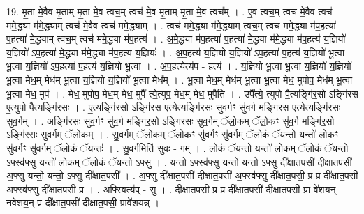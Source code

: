 \documentclass[17pt]{extarticle}
\begin{document}
19. मृ॒ता मे॒वैव मृ॒ताम् मृ॒ता मे॒व त्वच॒म् त्वच॑ मे॒व मृ॒ताम् मृ॒ता मे॒व त्वच᳚म् । . ए॒व त्वच॒म् त्वच॑ मे॒वैव त्वच॑ ममे॒द्ध्या म॑मे॒द्ध्याम् त्वच॑ मे॒वैव त्वच॑ ममे॒द्ध्याम् । . त्वच॑ ममे॒द्ध्या म॑मे॒द्ध्याम् त्वच॒म् त्वच॑ ममे॒द्ध्या म॑प॒हत्या॑ प॒हत्या॑ मे॒द्ध्याम् त्वच॒म् त्वच॑ ममे॒द्ध्या म॑प॒हत्य॑ । . अ॒मे॒द्ध्या म॑प॒हत्या॑ प॒हत्या॑ मे॒द्ध्या म॑मे॒द्ध्या म॑प॒हत्य॑ य॒ज्ञियो॑ य॒ज्ञियो॑ ऽप॒हत्या॑ मे॒द्ध्या म॑मे॒द्ध्या म॑प॒हत्य॑ य॒ज्ञियः॑ । . अ॒प॒हत्य॑ य॒ज्ञियो॑ य॒ज्ञियो॑ ऽप॒हत्या॑ प॒हत्य॑ य॒ज्ञियो॑ भू॒त्वा भू॒त्वा य॒ज्ञियो॑ ऽप॒हत्या॑ प॒हत्य॑ य॒ज्ञियो॑ भू॒त्वा । . अ॒प॒हत्येत्य॑प - हत्य॑ । . य॒ज्ञियो॑ भू॒त्वा भू॒त्वा य॒ज्ञियो॑ य॒ज्ञियो॑ भू॒त्वा मेध॒म् मेध॑म् भू॒त्वा य॒ज्ञियो॑ य॒ज्ञियो॑ भू॒त्वा मेध᳚म् । . भू॒त्वा मेध॒म् मेध॑म् भू॒त्वा भू॒त्वा मेध॒ मुपोप॒ मेध॑म् भू॒त्वा भू॒त्वा मेध॒ मुप॑ । . मेध॒ मुपोप॒ मेध॒म् मेध॒ मुपै᳚ त्ये॒त्युप॒ मेध॒म् मेध॒ मुपै॑ति । . उपै᳚त्ये॒ त्युपो पै॒त्यङ्गि॑र॒सो ऽङ्गि॑रस ए॒त्युपो पै॒त्यङ्गि॑रसः । . ए॒त्यङ्गि॑र॒सो ऽङ्गि॑रस एत्ये॒त्यङ्गि॑रसः सुव॒र्गꣳ सु॑व॒र्ग मङ्गि॑रस एत्ये॒त्यङ्गि॑रसः सुव॒र्गम् । . अङ्गि॑रसः सुव॒र्गꣳ सु॑व॒र्ग मङ्गि॑र॒सो ऽङ्गि॑रसः सुव॒र्गम् ॅलो॒कम् ॅलो॒कꣳ सु॑व॒र्ग मङ्गि॑र॒सो ऽङ्गि॑रसः सुव॒र्गम् ॅलो॒कम् । . सु॒व॒र्गम् ॅलो॒कम् ॅलो॒कꣳ सु॑व॒र्गꣳ सु॑व॒र्गम् ॅलो॒कं ॅयन्तो॒ यन्तो॑ लो॒कꣳ सु॑व॒र्गꣳ सु॑व॒र्गम् ॅलो॒कं ॅयन्तः॑ । . सु॒व॒र्गमिति॑ सुवः - गम् । . लो॒कं ॅयन्तो॒ यन्तो॑ लो॒कम् ॅलो॒कं ॅयन्तो॒ ऽफ्स्व॑फ्सु यन्तो॑ लो॒कम् ॅलो॒कं ॅयन्तो॒ ऽफ्सु । . यन्तो॒ ऽफ्स्व॑फ्सु यन्तो॒ यन्तो॒ ऽफ्सु दी᳚क्षात॒पसी॑ दीक्षात॒पसी॑ अ॒फ्सु यन्तो॒ यन्तो॒ ऽफ्सु दी᳚क्षात॒पसी᳚ । . अ॒फ्सु दी᳚क्षात॒पसी॑ दीक्षात॒पसी॑ अ॒फ्स्व॑फ्सु दी᳚क्षात॒पसी॒ प्र प्र दी᳚क्षात॒पसी॑ अ॒फ्स्व॑फ्सु दी᳚क्षात॒पसी॒ प्र । . अ॒फ्स्वित्य॑प् - सु । . दी॒क्षा॒त॒पसी॒ प्र प्र दी᳚क्षात॒पसी॑ दीक्षात॒पसी॒ प्रा वे॑शयन् नवेशय॒न् प्र दी᳚क्षात॒पसी॑ दीक्षात॒पसी॒ प्रावे॑शयन्न् । \newline
\end{document}
